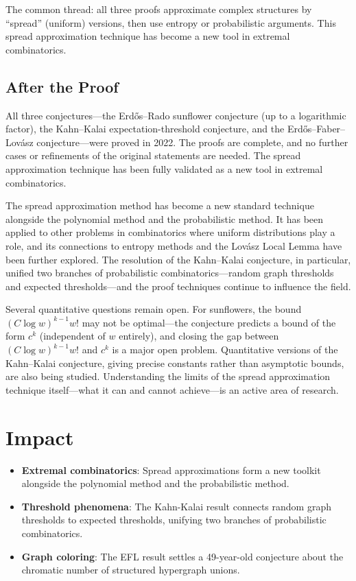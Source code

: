 \begin{highlightbox}
The common thread: all three proofs approximate complex structures by ``spread'' (uniform) versions, then use entropy or probabilistic arguments. This spread approximation technique has become a new tool in extremal combinatorics.
\end{highlightbox}

\subsection{After the Proof}

All three conjectures---the Erd\H{o}s--Rado sunflower conjecture (up to a logarithmic factor), the Kahn--Kalai expectation-threshold conjecture, and the Erd\H{o}s--Faber--Lov\'{a}sz conjecture---were proved in 2022. The proofs are complete, and no further cases or refinements of the original statements are needed. The spread approximation technique has been fully validated as a new tool in extremal combinatorics.

The spread approximation method has become a new standard technique alongside the polynomial method and the probabilistic method. It has been applied to other problems in combinatorics where uniform distributions play a role, and its connections to entropy methods and the Lov\'{a}sz Local Lemma have been further explored. The resolution of the Kahn--Kalai conjecture, in particular, unified two branches of probabilistic combinatorics---random graph thresholds and expected thresholds---and the proof techniques continue to influence the field.

Several quantitative questions remain open. For sunflowers, the bound $(C \log w)^{k-1} w!$ may not be optimal---the conjecture predicts a bound of the form $c^k$ (independent of $w$ entirely), and closing the gap between $(C \log w)^{k-1} w!$ and $c^k$ is a major open problem. Quantitative versions of the Kahn--Kalai conjecture, giving precise constants rather than asymptotic bounds, are also being studied. Understanding the limits of the spread approximation technique itself---what it can and cannot achieve---is an active area of research.

\section{Impact}
\begin{itemize}
\item \textbf{Extremal combinatorics}: Spread approximations form a new toolkit alongside the polynomial method and the probabilistic method.
\item \textbf{Threshold phenomena}: The Kahn-Kalai result connects random graph thresholds to expected thresholds, unifying two branches of probabilistic combinatorics.
\item \textbf{Graph coloring}: The EFL result settles a 49-year-old conjecture about the chromatic number of structured hypergraph unions.
\end{itemize}

